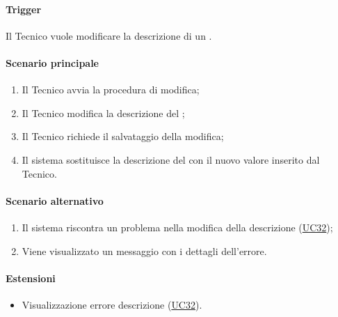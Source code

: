 \paragraph*{Trigger}
Il Tecnico vuole modificare la descrizione di un .

\paragraph*{Scenario principale}
\begin{enumerate}
  \item Il Tecnico avvia la procedura di modifica;
  \item Il Tecnico modifica la descrizione del ;
  \item Il Tecnico richiede il salvataggio della modifica;
  \item Il sistema sostituisce la descrizione del  con il nuovo valore inserito dal Tecnico.
\end{enumerate}

\paragraph*{Scenario alternativo}
\begin{enumerate}
  \item Il sistema riscontra un problema nella modifica della descrizione (\hyperref[UC32]{UC32});
  \item Viene visualizzato un messaggio con i dettagli dell'errore.
\end{enumerate}

\paragraph*{Estensioni}
\begin{itemize}
  \item Visualizzazione errore descrizione  (\hyperref[UC32]{UC32}).
\end{itemize}
